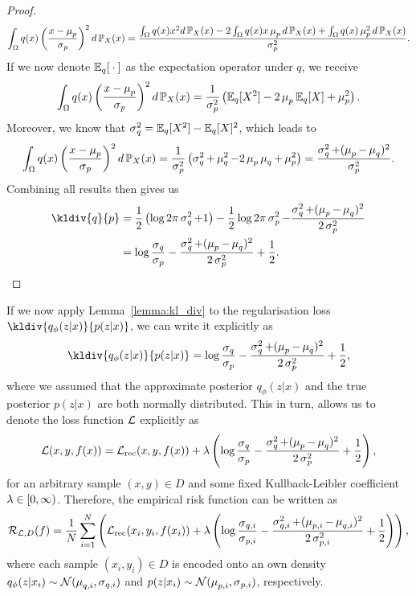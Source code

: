 \begin{proof}
\begin{align*}
\int_{\Omega} q(x) \left( \frac{x - \operatorname{\mu}_{p}}{\operatorname{\sigma}_{p}} \right)^2 d\operatorname{\mathbb{P}}_X(x) = \frac{\int_{\Omega} q(x) x^2 d\operatorname{\mathbb{P}}_X(x) - 2 \int_{\Omega} q(x) x\operatorname{\mu}_{p} d\operatorname{\mathbb{P}}_X(x) + \int_{\Omega} q(x) \operatorname{\mu}_{p}^2 d\operatorname{\mathbb{P}}_X(x)}{\operatorname{\sigma}_p^2}.
\end{align*}
If we now denote $\operatorname{\mathbb{E}}_q[{}\cdot{}]$ as the expectation operator under $q$, we receive
\begin{align*}
\int_{\Omega} q(x) \left( \frac{x - \operatorname{\mu}_{p}}{\operatorname{\sigma}_{p}} \right)^2 d\operatorname{\mathbb{P}}_X(x) = \frac{1}{\operatorname{\sigma}_p^2} \left(\operatorname{\mathbb{E}}_q[X^2] - 2 \operatorname{\mu}_p \operatorname{\mathbb{E}}_q[X] + \operatorname{\mu}_p^2 \right).
\end{align*}
Moreover, we know that $\operatorname{\sigma}_q^2 = \operatorname{\mathbb{E}}_q[X^2] - \operatorname{\mathbb{E}}_q[X]^2$, which leads to
\begin{align*}
\int_{\Omega} q(x) \left( \frac{x - \operatorname{\mu}_{p}}{\operatorname{\sigma}_{p}} \right)^2 d\operatorname{\mathbb{P}}_X(x) = \frac{1}{\operatorname{\sigma}_p^2}\left( \operatorname{\sigma}_q^2 +\operatorname{\mu}_q^2 - 2 \operatorname{\mu}_p\operatorname{\mu}_q +\operatorname{\mu}_p^2 \right)= \frac{\operatorname{\sigma}_q^2 + (\operatorname{\mu}_p - \operatorname{\mu}_q)^2}{\operatorname{\sigma}_p^2}.
\end{align*}
Combining all results then gives us
\begin{align*}
\kldiv{q}{p} &= \frac{1}{2} \left(\log 2\pi \s_q^{2} + 1\right) - \frac{1}{2} \log 2\pi \s_p^{2} - \frac{\s_q^2 + (\m_p - \m_q)^2}{2\s_p^2}\\
&= \log \frac{\s_q}{\s_p} - \frac{\s_q^2 + (\m_p - \m_q)^2}{2\s_p^2} + \frac{1}{2}.
\end{align*}
\end{proof}

If we now apply Lemma~\ref{lemma:kl_div} to the regularisation loss $\kldiv{q_{\phi}(z|x)}{p(z|x)}$, we can write it explicitly as
\begin{align*}
\kldiv{q_{\phi}(z|x)}{p(z|x)} = \log \frac{\s_q}{\s_p} - \frac{\s_q^2 + (\m_p - \m_q)^2}{2\s_p^2} + \frac{1}{2},
\end{align*}
where we assumed that the approximate posterior $q_{\phi}(z|x)$ and the true posterior $p(z|x)$ are both normally distributed. This in turn, allows us to denote the loss function $\operatorname{\mathcal{L}}$ explicitly as
\begin{align}\label{eq:vae_loss}
\operatorname{\mathcal{L}}(x, y, f(x)) = \operatorname{\mathcal{L}}_{\text{rec}}(x, y, f(x)) + \lambda \left( \log \frac{\operatorname{\sigma}_q}{\operatorname{\sigma}_p} - \frac{\operatorname{\sigma}_q^2 + (\operatorname{\mu}_p - \operatorname{\mu}_q)^2}{2\operatorname{\sigma}_p^2} + \frac{1}{2}\right),
\end{align}
for an arbitrary sample $(x,y)\in D$ and some fixed Kullback-Leibler coefficient $\lambda\in [0,\infty)$. Therefore, the empirical risk function can be written as
\begin{align*}
\operatorname{\mathcal{R}}_{\operatorname{\mathcal{L}}, D} (f) = \frac{1}{N} \sum_{i=1}^N \left( \operatorname{\mathcal{L}}_{\text{rec}}(x_i, y_i, f(x_i)) + \lambda \left(\log \frac{\operatorname{\sigma}_{q, i}}{\operatorname{\sigma}_{p, i}} - \frac{\operatorname{\sigma}_{q, i}^2 + (\operatorname{\mu}_{p, i} - \operatorname{\mu}_{q, i})^2}{2\operatorname{\sigma}_{p, i}^2} + \frac{1}{2} \right)\right),
\end{align*}
where each sample $(x_i,y_i)\in D$ is encoded onto an own density $q_{\phi}(z|x_i)\sim \mathcal{N}(\operatorname{\mu}_{q, i}, \operatorname{\sigma}_{q, i})$ and $p(z|x_i)\sim \mathcal{N}(\operatorname{\mu}_{p, i}, \operatorname{\sigma}_{p, i})$, respectively.

